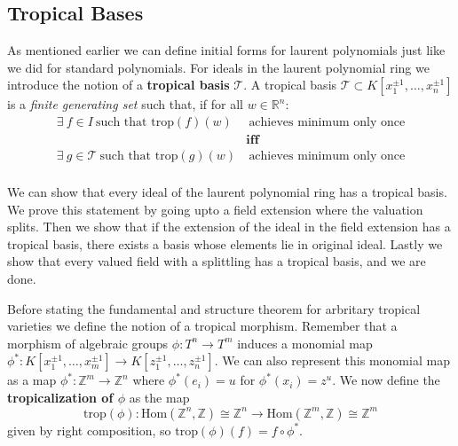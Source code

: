     \subsection{Tropical Bases}
    As mentioned earlier we can define initial forms for laurent polynomials just like we did for standard polynomials. For ideals in the laurent polynomial ring we introduce the notion of a \textbf{tropical basis} $\mathcal{T}$.
    A tropical basis $\mathcal{T}\subset K[x_1^{\pm 1}, \dots, x_n^{\pm 1}]$ is a \textit{finite generating set} such that, if for all $w \in \mathbb{R}^{n}$:
    \begin{align*}
        \exists ~f \in I~\text{such that }\text{trop}(f)(w)&~\text{achieves minimum only once}\\
                                                          & \textbf{iff}\\
        \exists ~g \in \mathcal{T}~\text{such that }\text{trop}(g)(w)&~\text{achieves minimum only once}\\
    \end{align*}
    \par We can show that every ideal of the laurent polynomial ring has a tropical basis. We prove this statement by going upto a field extension where the valuation splits. 
    Then we show that if the extension of the ideal in the field extension has a tropical basis, there exists a basis whose elements lie in original ideal. 
    Lastly we show that every valued field with a splittling has a tropical basis, and we are done.
    \par Before stating the fundamental and structure theorem for arbritary tropical varieties we define the notion of a tropical morphism.
    Remember that a morphism of algebraic groups $\phi : T^{n}\to T^{m}$ induces a monomial map $\phi^{*}:K[x_1^{\pm 1}, \dots, x_m^{\pm 1}]\to K[z_1^{\pm 1}, \dots, z_n^{\pm 1}]$. 
    We can also represent this monomial map as a map $\phi^{*}: \mathbb{Z}^{m}\to \mathbb{Z}^{n}$ where $\phi^{*}(e_i) = u$ for $\phi^{*}(x_i) = z^u$. We now define the \textbf{tropicalization of $\phi$} as the map
    \begin{equation*}
        \text{trop}(\phi): \text{Hom}(\mathbb{Z}^{n},\mathbb{Z})\cong \mathbb{Z}^{n} \to \text{Hom}(\mathbb{Z}^{m},\mathbb{Z})\cong \mathbb{Z}^{m}
    \end{equation*}
    given by right composition, so $\text{trop}(\phi)(f)= f \circ \phi^{*}$.

